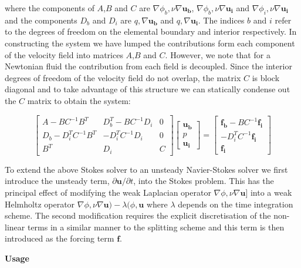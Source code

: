 where the components of $A$,$B$ and $C$ are $\nabla\phi_b,\nu\nabla\boldsymbol{u_b}$, $\nabla\phi_b,\nu\nabla\boldsymbol{u_i}$ and $\nabla\phi_i,\nu\nabla\boldsymbol{u_i}$ and the components $D_b$ and $D_i$ are $q,\nabla\boldsymbol{u_b}$ and $q,\nabla\boldsymbol{u_i}$.
The indices $b$ and $i$ refer to the degrees of freedom on the elemental boundary and interior respectively. In constructing the system we have lumped the contributions form each component of the velocity field into matrices $A$,$B$ and $C$. However, we note that for a Newtonian fluid the contribution from each field is decoupled. Since the interior degrees of freedom of the velocity field do not overlap, the matrix $C$ is block diagonal and to take advantage of this structure we can statically condense out the $C$ matrix to obtain the system:

\begin{equation}
\left[ \begin{array}{ccc}
 A-BC^{-1}B^T & D_b^T-BC^{-1}D_i & 0\\
 D_b-D_i^TC^{-1}B^T & -D_i^TC^{-1}D_i & 0\\
 B^T & D_i & C
 \end{array}\right]
 \left[ \begin{array}{c}
 \boldsymbol{u_b}\\
 p\\
 \boldsymbol{u_i}
 \end{array}\right] =
 \left[ \begin{array}{c}
 \boldsymbol{f_b} - BC^{-1}\boldsymbol{f_i}\\
 -D_i^TC^{-1}\boldsymbol{f_i}\\
 \boldsymbol{f_i}
 \end{array}\right]
 \end{equation}
 
 To extend the above Stokes solver to an unsteady Navier-Stokes solver we first introduce the unsteady term, $\partial \boldsymbol{u}/\partial t$, into the Stokes problem.
This has the principal effect of modifying the weak Laplacian operator $\nabla\phi,\nu\nabla\boldsymbol{u}$] into a weak Helmholtz operator
$\nabla\phi,\nu\nabla\boldsymbol{u})-\lambda(\phi,\boldsymbol{u}$ where $\lambda$ depends on the time integration scheme. The second modification requires the explicit discretisation of the non-linear terms in a similar manner to the splitting scheme and this term is then introduced as the forcing term $\boldsymbol{f}$.

\textbf{Usage}

